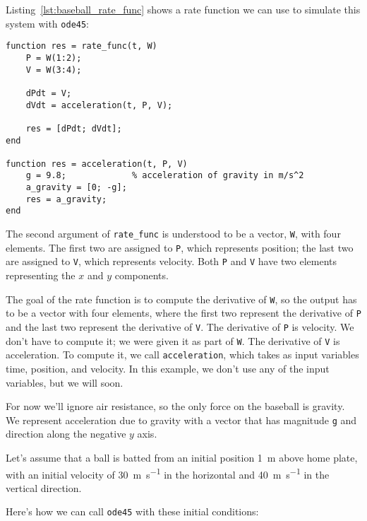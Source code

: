 Listing~\ref{lst:baseball_rate_func} shows a rate function we can use to simulate this system with {\tt ode45}:

\begin{lstlisting}[caption={A rate function we can use to model the flight of a baseball}, label={lst:baseball_rate_func}]
function res = rate_func(t, W)
    P = W(1:2);
    V = W(3:4);

    dPdt = V;
    dVdt = acceleration(t, P, V);

    res = [dPdt; dVdt];
end

function res = acceleration(t, P, V)
    g = 9.8;             % acceleration of gravity in m/s^2
    a_gravity = [0; -g];
    res = a_gravity;
end
\end{lstlisting}

The second argument of \verb"rate_func" is understood to be a vector,
{\tt W}, with four elements.  The first two are assigned to {\tt P},
which represents position; the last two are assigned to {\tt V}, which
represents velocity. Both {\tt P} and {\tt V} have two elements
representing the $x$ and $y$ components.


The goal of the rate function is to compute the derivative of {\tt W}, so the output has to be a vector with four elements, where the first two represent the derivative of {\tt P}  and the last two represent the derivative of {\tt V}.
The derivative of {\tt P} is velocity.  We don't have to compute it; we were given it as part of {\tt W}.
The derivative of {\tt V} is acceleration.  To compute it, we call {\tt acceleration}, which takes as input variables time, position, and velocity.  In this example, we don't use any of the input variables, but we will soon.


For now we'll ignore air resistance, so the only force on the baseball is gravity.  We represent acceleration due to gravity with a vector that has magnitude {\tt g} and direction along the negative $y$ axis.

Let's assume that a ball is batted from an initial position \SI{1}{\meter} above home plate, with an initial velocity of \SI{30}{\meter\per\second} in the horizontal and \SI{40}{\meter\per\second} in the vertical direction.


Here's how we can call {\tt ode45} with these initial conditions:
 
